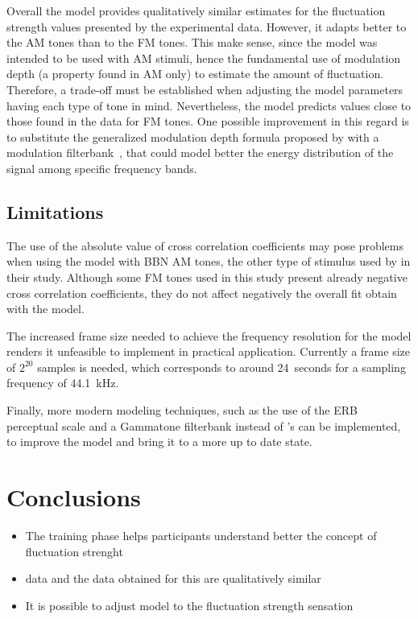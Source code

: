 \documentclass[../main.tex]{subfiles}
\begin{document}
Overall the model provides qualitatively similar estimates for the fluctuation
strength values presented by the experimental data. However, it adapts better to
the \gls{AM} tones than to the \gls{FM} tones. This make sense, since the model
was intended to be used with \gls{AM} stimuli, hence the fundamental use of
modulation depth (a property found in \gls{AM} only) to estimate the amount of
fluctuation. Therefore, a trade-off must be established when adjusting the model
parameters having each type of tone in mind. Nevertheless, the model predicts
values close to those found in the data for \gls{FM} tones. One possible
improvement in this regard is to substitute the generalized modulation depth
formula proposed by \citeauthor{daniel1997psychoacoustical} with a modulation
filterbank~\cite{Dau1997}, that could model better the energy distribution of
the signal among specific frequency bands.

\subsection{Limitations}

The use of the absolute value of cross correlation coefficients may pose
problems when using the model with \gls{BBN} \gls{AM} tones, the other type
of stimulus used by \citeauthor{Fastl2007Psychoacoustics} in their study.
Although some \gls{FM} tones used in this study present already negative cross
correlation coefficients, they do not affect negatively the overall fit obtain
with the model.

The increased frame size needed to achieve the frequency resolution for the
model renders it unfeasible to implement in practical application. Currently
a frame size of $2^{20}$ samples is needed, which corresponds to around
24~seconds for a sampling frequency of 44.1~kHz.

Finally, more modern modeling techniques, such as the use of the ERB perceptual
scale and a Gammatone filterbank instead of \citeauthor{Terhardt1979}'s can be
implemented, to improve the model and bring it to a more up to date state.

\section{Conclusions}

\begin{itemize}
  \item The training phase helps participants understand better the concept of
    fluctuation strenght
  \item \citeauthor{Fastl2007Psychoacoustics} data and the data obtained for
    this are qualitatively similar
  \item It is possible to adjust \citeauthor{daniel1997psychoacoustical} model
    to the fluctuation strength sensation
\end{itemize}
\end{document}
